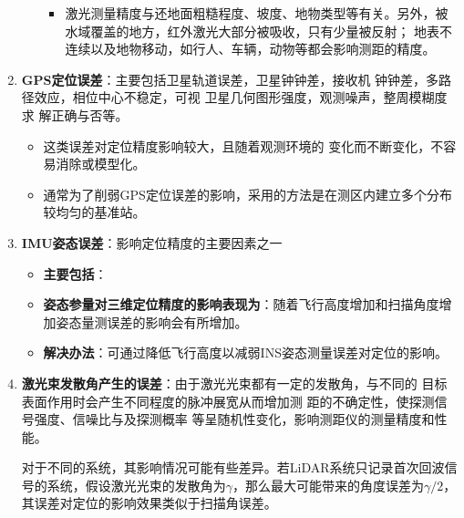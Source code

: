 \begin{enumerate}
\begin{enumerate}
\begin{itemize}
\begin{itemize}
			\end{itemize}
			\item 激光测量精度与还地面粗糙程度、坡度、地物类型等有关。另外，被水域覆盖的地方，红外激光大部分被吸收，只有少量被反射；
			地表不连续以及地物移动，如行人、车辆，动物等都会影响测距的精度。
		\end{itemize} %
	\end{enumerate} %
	\item \textbf{GPS定位误差}：主要包括卫星轨道误差，卫星钟钟差，接收机
	钟钟差，多路径效应，相位中心不稳定，可视
	卫星几何图形强度，观测噪声，整周模糊度求
	解正确与否等。
	\begin{itemize}
		\item 这类误差对定位精度影响较大，且随着观测环境的 变化而不断变化，不容易消除或模型化。
		\item 通常为了削弱GPS定位误差的影响，采用的方法是在测区内建立多个分布较均匀的基准站。
	\end{itemize} %
	\item \textbf{IMU姿态误差}：影响定位精度的主要因素之一
	\begin{itemize}
		\item \textbf{主要包括}：
		\item \textbf{姿态参量对三维定位精度的影响表现为}：随着飞行高度增加和扫描角度增加姿态量测误差的影响会有所增加。
		\item \textbf{解决办法}：可通过降低飞行高度以减弱INS姿态测量误差对定位的影响。
	\end{itemize} %
	\item \textbf{激光束发散角产生的误差}：由于激光光束都有一定的发散角，与不同的
	目标表面作用时会产生不同程度的脉冲展宽从而增加测
	距的不确定性，使探测信号强度、信噪比与及探测概率
	等呈随机性变化，影响测距仪的测量精度和性能。
	
	对于不同的系统，其影响情况可能有些差异。若LiDAR系统只记录首次回波信号的系统，假设激光光束的发散角为$ \gamma $，那么最大可能带来的角度误差为$ \gamma/2 $，其误差对定位的影响效果类似于扫描角误差。
\end{enumerate} %

